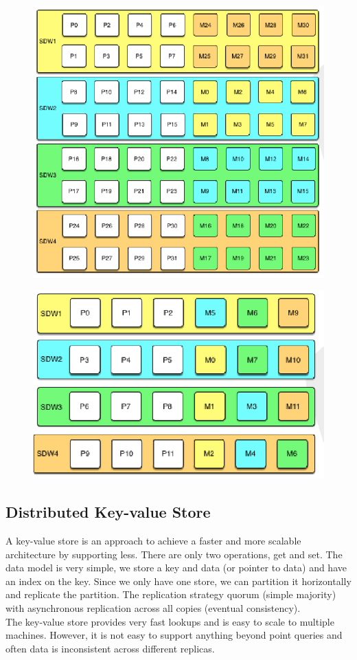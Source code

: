 \begin{figure}[H]
\begin{minipage}[t]{.5\textwidth}
\centering
\includegraphics[width=.8\textwidth]{images/group_mirroring.PNG}
\label{group_mirroring}
\end{minipage}
\begin{minipage}[t]{.5\textwidth}
\centering
\includegraphics[width=\textwidth]{images/spread_mirroring.PNG}
\label{spread_mirroring}
\end{minipage}
\end{figure}

\subsection{Distributed Key-value Store}
A key-value store is an approach to achieve a faster and more scalable architecture by supporting less. There are only two operations, get and set. The data model is very simple, we store a key and data (or pointer to data) and have an index on the key. Since we only have one store, we can partition it horizontally and replicate the partition. The replication strategy quorum (simple majority) with asynchronous replication across all copies (eventual consistency).\\
The key-value store provides very fast lookups and is easy to scale to multiple machines. However, it is not easy to support anything beyond point queries and often data is inconsistent across different replicas.


